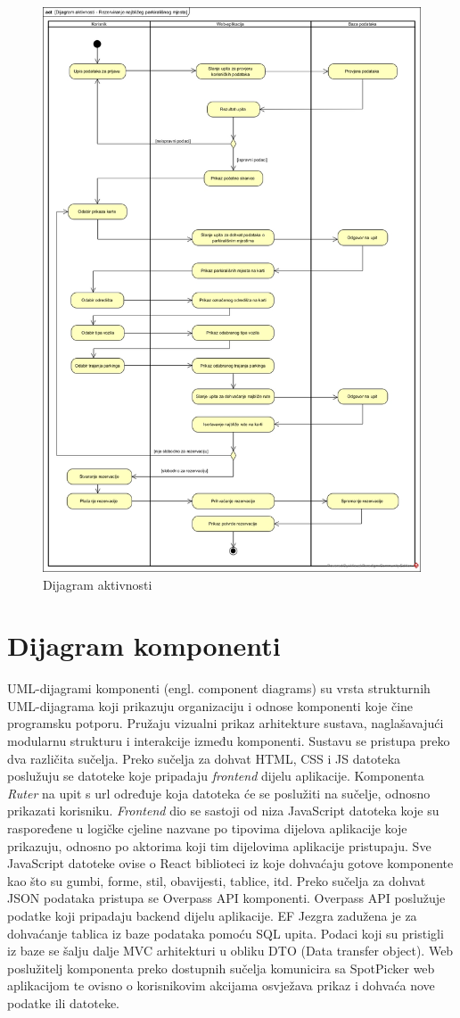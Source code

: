 \begin{figure}[H]
	\includegraphics[width=\textwidth, height=\textwidth]{slike/dijagram_aktivnosti.jpg} %
	\centering
	\caption{Dijagram aktivnosti}
	\label{fig:dijagramaktivnosti}
\end{figure}


\eject 


\section{Dijagram komponenti}

UML-dijagrami komponenti (engl. component diagrams) su vrsta strukturnih UML-dijagrama koji
prikazuju organizaciju i odnose komponenti koje čine programsku potporu. Pružaju vizualni prikaz 
arhitekture sustava, naglašavajući modularnu strukturu i interakcije između komponenti. Sustavu se pristupa preko
dva različita sučelja. Preko sučelja za dohvat HTML, CSS i JS datoteka poslužuju se 
datoteke koje pripadaju \textit{frontend} dijelu aplikacije. Komponenta \textit{Ruter} na
upit s url određuje koja datoteka će se poslužiti na sučelje, odnosno prikazati korisniku. \textit{Frontend} dio se sastoji od niza JavaScript datoteka koje su raspoređene u logičke cjeline nazvane po tipovima dijelova aplikacije koje prikazuju, odnosno po aktorima koji tim dijelovima aplikacije pristupaju. Sve JavaScript datoteke ovise o React biblioteci iz
koje dohvaćaju gotove komponente kao što su gumbi, forme, stil, obavijesti, tablice, itd. Preko sučelja za dohvat JSON podataka pristupa se Overpass API komponenti. Overpass API poslužuje 
podatke koji pripadaju backend dijelu aplikacije. EF Jezgra zadužena je za dohvaćanje tablica iz baze podataka pomoću SQL upita. Podaci koji su pristigli iz baze se šalju dalje MVC arhitekturi u obliku DTO (Data transfer object).  Web poslužitelj komponenta preko dostupnih sučelja komunicira sa SpotPicker web aplikacijom te ovisno o korisnikovim akcijama osvježava prikaz i dohvaća nove podatke ili datoteke.

